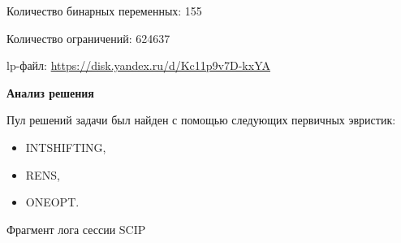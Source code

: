 \documentclass[%
	11pt,
	a4paper,
	utf8,
		]{article}
\begin{document}
Количество бинарных переменных: 155

Количество ограничений: 624637

lp-файл: \url{https://disk.yandex.ru/d/Kc11p9v7D-kxYA}

\vspace*{5mm}\textbf{Анализ решения}\vspace*{1mm}

Пул решений задачи был найден с помощью следующих первичных эвристик:
\begin{itemize}
	\item INTSHIFTING,
	
	\item RENS,
	
	\item ONEOPT.
\end{itemize}

Фрагмент лога сессии SCIP
\end{document}
